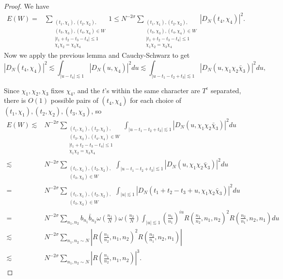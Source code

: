\begin{proof}
    We have \begin{align*}    
    E(W)=& \sum_{\substack{(t_1,\chi_1),(t_2,\chi_2),\\ (t_3,\chi_3),(t_4,\chi_4)\in W\\|t_1+t_2-t_3-t_4|\leq 1\\ \chi_1\chi_2=\chi_3\chi_4}} 1 
    \leq N^{-2\sigma}\sum_{\substack{(t_1,\chi_1),(t_2,\chi_2),\\ (t_3,\chi_3),(t_4,\chi_4)\in W\\ |t_1+t_2-t_3-t_4|\leq 1\\ \chi_1\chi_2=\chi_3\chi_4}} |D_N(t_4,\chi_4)|^2.
    \end{align*}
    Now we apply the previous lemma and Cauchy-Schwarz to get \[
        |D_N(t_4,\chi_4)|^2\lesssim \int_{|u-t_4|\lesssim 1} |D_N(u,\chi_4)|^2du \lesssim  \int_{|u-t_1-t_2+t_3|\lesssim 1} |D_N(u,\chi_1\chi_2\bar{\chi}_3)|^2du,
    \]
   
    Since $\chi_1,\chi_2,\chi_3$ fixes $\chi_4$, and the $t$'s within the same character are $T^\epsilon$ separated, there is $O(1)$ possible pairs of $(t_4,\chi_4)$ for each choice of $(t_1,\chi_1),(t_2,\chi_2),(t_3,\chi_3)$, so \begin{align*}    
        E(W)\lesssim& N^{-2\sigma}\sum_{\substack{(t_1,\chi_1),(t_2,\chi_2),\\ (t_3,\chi_3),(t_4,\chi_4)\in W\\ |t_1+t_2-t_3-t_4|\leq 1\\ \chi_1\chi_2=\chi_3\chi_4}} \int_{|u-t_1-t_2+t_3|\lesssim 1} |D_N(u,\chi_1\chi_2\bar{\chi}_3)|^2du\\
        \lesssim&  N^{-2\sigma}\sum_{\substack{(t_1,\chi_1),(t_2,\chi_2),\\ (t_3,\chi_3)\in W}} \int_{|u-t_1-t_2+t_3|\lesssim 1} |D_N(u,\chi_1\chi_2\bar{\chi}_3)|^2du\\
        =& N^{-2\sigma}\sum_{\substack{(t_1,\chi_1),(t_2,\chi_2),\\ (t_3,\chi_3)\in W}} \int_{|u|\lesssim 1} |D_N(t_1+t_2-t_3 + u,\chi_1\chi_2\bar{\chi}_3)|^2du\\
        =&N^{-2\sigma}\sum_{n_1,n_2} b_{n_1}\bar{b}_{n_2} \omega\left(\frac{n_1}{N}\right)\omega\left(\frac{n_2}{N}\right)\int_{|u|\lesssim 1} \left(\frac{n_1}{n_1}\right)^{iu}R\left(\frac{n_1}{n_2},n_1,n_2\right)^2 R\left(\frac{n_2}{n_1},n_2,n_1\right)du\\
        \lesssim & N^{-2\sigma}\sum_{n_1,n_2\sim N}\left|R\left(\frac{n_1}{n_2},n_1,n_2\right)^2 R\left(\frac{n_2}{n_1},n_2,n_1\right)\right|\\
        \lesssim & N^{-2\sigma}\sum_{n_1,n_2\sim N}\left|R\left(\frac{n_1}{n_2},n_1,n_2\right) \right|^3.
        \end{align*}
\end{proof}

